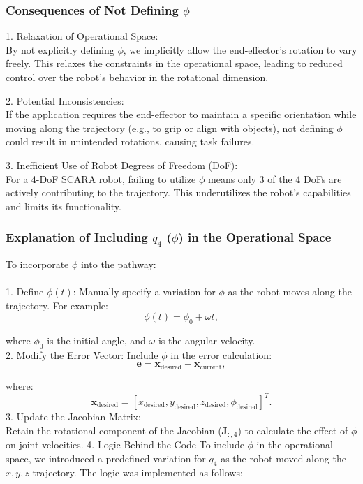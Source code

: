 \documentclass[12pt]{report}
\begin{document}
		
		\subsubsection{Consequences of Not Defining \(\phi\)}
		
		1. Relaxation of Operational Space:\\By not explicitly defining \(\phi\), we implicitly allow the end-effector's rotation to vary freely. This relaxes the constraints in the operational space, leading to reduced control over the robot's behavior in the rotational dimension.
		
		2. Potential Inconsistencies:\\If the application requires the end-effector to maintain a specific orientation while moving along the trajectory (e.g., to grip or align with objects), not defining \(\phi\) could result in unintended rotations, causing task failures.
		
		3. Inefficient Use of Robot Degrees of Freedom (DoF):\\For a 4-DoF SCARA robot, failing to utilize \(\phi\) means only 3 of the 4 DoFs are actively contributing to the trajectory. This underutilizes the robot's capabilities and limits its functionality.
		
		
		\subsubsection{Explanation of Including \(q_4\) (\(\phi\)) in the Operational Space
		}
		To incorporate \(\phi\) into the pathway:\\\\
		1. Define \(\phi(t)\):
		Manually specify a variation for \(\phi\) as the robot moves along the trajectory. For example:
	\begin{equation}
		\phi(t) = \phi_0 + \omega t,
	\end{equation}
	
		where \(\phi_0\) is the initial angle, and \(\omega\) is the angular velocity.\\2. Modify the Error Vector: Include \(\phi\) in the error calculation:
	\begin{equation}
		\mathbf{e} = \mathbf{x}_{\text{desired}} - \mathbf{x}_{\text{current}},
	\end{equation}
	
		where:
		\begin{equation}
			\mathbf{x}_{\text{desired}} = [x_{\text{desired}}, y_{\text{desired}}, z_{\text{desired}}, \phi_{\text{desired}}]^T.
		\end{equation}
		3. Update the Jacobian Matrix:\\Retain the rotational component of the Jacobian (\(\mathbf{J}_{:,4}\)) to calculate the effect of \(\phi\) on joint velocities. 4. Logic Behind the Code To include \(\phi\) in the operational space, we introduced a predefined variation for \(q_4\) as the robot moved along the \(x, y, z\) trajectory. The logic was implemented as follows:
		
\end{document}
